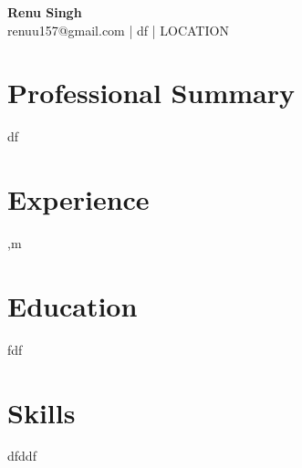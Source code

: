 \documentclass[11pt,a4paper]{article}
\begin{document}
\begin{center}
{\Huge \textbf{Renu Singh}}\\
renuu157@gmail.com | df | {{LOCATION}}
\end{center}

\section*{Professional Summary}
df

\section*{Experience}
,m

\section*{Education}
fdf

\section*{Skills}
dfddf
\end{document}
